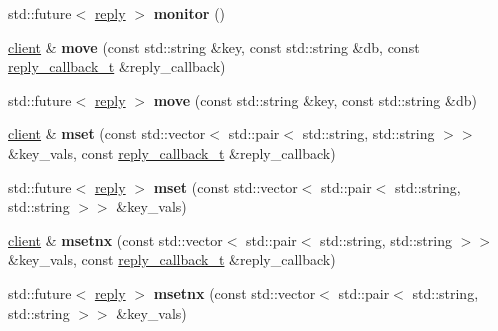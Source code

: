 \begin{DoxyCompactItemize}
\item 
\mbox{\label{classcpp__redis_1_1client_afd727179e9ee9348ced168a9ac70cbf7}} 
std\+::future$<$ \hyperlink{classcpp__redis_1_1reply}{reply} $>$ {\bfseries monitor} ()
\item 
\mbox{\label{classcpp__redis_1_1client_ad84393d728fb69b527a1d7b009270b58}} 
\hyperlink{classcpp__redis_1_1client}{client} \& {\bfseries move} (const std\+::string \&key, const std\+::string \&db, const \hyperlink{classcpp__redis_1_1client_a061a1140d36d2eaeda82b09a0bb3f9f2}{reply\+\_\+callback\+\_\+t} \&reply\+\_\+callback)
\item 
\mbox{\label{classcpp__redis_1_1client_ab50d18d50ac6d0bb7b91347c3a574960}} 
std\+::future$<$ \hyperlink{classcpp__redis_1_1reply}{reply} $>$ {\bfseries move} (const std\+::string \&key, const std\+::string \&db)
\item 
\mbox{\label{classcpp__redis_1_1client_acd9e2a69abc97bb7735425fdaebe788d}} 
\hyperlink{classcpp__redis_1_1client}{client} \& {\bfseries mset} (const std\+::vector$<$ std\+::pair$<$ std\+::string, std\+::string $>$$>$ \&key\+\_\+vals, const \hyperlink{classcpp__redis_1_1client_a061a1140d36d2eaeda82b09a0bb3f9f2}{reply\+\_\+callback\+\_\+t} \&reply\+\_\+callback)
\item 
\mbox{\label{classcpp__redis_1_1client_a369f84ea90c49095a3222d6f210410f8}} 
std\+::future$<$ \hyperlink{classcpp__redis_1_1reply}{reply} $>$ {\bfseries mset} (const std\+::vector$<$ std\+::pair$<$ std\+::string, std\+::string $>$$>$ \&key\+\_\+vals)
\item 
\mbox{\label{classcpp__redis_1_1client_ae04ade1f429088a437a4ea618a465a18}} 
\hyperlink{classcpp__redis_1_1client}{client} \& {\bfseries msetnx} (const std\+::vector$<$ std\+::pair$<$ std\+::string, std\+::string $>$$>$ \&key\+\_\+vals, const \hyperlink{classcpp__redis_1_1client_a061a1140d36d2eaeda82b09a0bb3f9f2}{reply\+\_\+callback\+\_\+t} \&reply\+\_\+callback)
\item 
\mbox{\label{classcpp__redis_1_1client_a792ed8b2d5f3a38e8b9dfaef7f814d19}} 
std\+::future$<$ \hyperlink{classcpp__redis_1_1reply}{reply} $>$ {\bfseries msetnx} (const std\+::vector$<$ std\+::pair$<$ std\+::string, std\+::string $>$$>$ \&key\+\_\+vals)

\end{DoxyCompactItemize}
